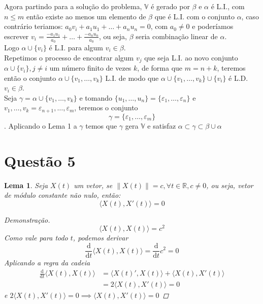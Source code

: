 \documentclass[12pt,letterpaper]{article}
\newtheorem{lemma}{Lema}
\begin{document}
  Agora partindo para a solução do problema, \(\mathbb{V}\) é gerado por \(\beta\) e \(\alpha\) é L.I., com \(n \leq m\) então existe ao menos um elemento de \(\beta\) que é L.I. com o conjunto \(\alpha\), caso contrário teriamos:  \(a_0v_i + a_1u_1 + \dots + a_nu_n = 0\), com \(a_0 \neq 0\) e poderíamos escrever \(v_i = \frac{-a_1u_1}{a_0} + \dots + \frac{-a_nu_n}{a_0}\), ou seja, \(\beta\) seria combinação linear de \(\alpha\).\\
  Logo \(\alpha \cup \{v_i\}\) é L.I. para algum \(v_i \in \beta\).\\
  Repetimos o processo de encontrar algum \(v_j\) que seja L.I. ao novo conjunto  \(\alpha \cup \{v_i\}, j \neq i\) um número finito de vezes \(k\), de forma que \(m = n + k\), teremos então o conjunto \(\alpha \cup \{v_1, \dots, v_k\}\) L.I. de modo que \(\alpha \cup \{v_1, \dots, v_k\} \cup \{v_i\}\) é L.D. \forall \(v_i \in \beta\).\\
  Seja \(\gamma = \alpha \cup \{v_1, \dots, v_k\} \) e tomando \(\{u_1,\dots, u_n\} = \{\varepsilon_1, \dots, \varepsilon_n\}\) e \(v_1, \dots, v_k = \varepsilon_{n+1}, \dots, \varepsilon_m\), teremos o conjunto \[\gamma = \{\varepsilon_1, \dots, \varepsilon_m\}\].
  Aplicando o Lema 1 a \(\gamma\) temos que \(\gamma\) gera \(\mathbb{V}\) e satisfaz \(\alpha \subset \gamma \subset \beta \cup \alpha \)

\newpage
\section*{Questão 5}
\begin{lemma}
Seja \(X(t)\) um vetor, se \(\lVert X(t) \rVert = c, \forall t \in \mathbb{R}, c\neq 0\), ou seja, vetor de módulo constante não nulo, então:
\[\langle X(t), X'(t) \rangle = 0\]
\begin{proof}[Demonstração]
\[\langle X(t), X(t) \rangle = c^2\]
Como vale para todo \(t\), podemos derivar
\[ \frac{\mathrm{d}}{\mathrm{d}t}\langle X(t), X(t) \rangle = \frac{\mathrm{d}}{\mathrm{d}t}c^2 = 0 \]
Aplicando a regra da cadeia
\begin{align*}
  \frac{\mathrm{d}}{\mathrm{d}t} \langle X(t), X(t) \rangle &=  \langle X(t)', X(t) \rangle + \langle X(t), X'(t) \rangle \\
  &= 2 \langle X(t), X'(t) \rangle = 0
\end{align*}
e \(2 \langle X(t), X'(t) \rangle = 0 \implies \langle X(t), X'(t) \rangle = 0\)
\end{proof}
\end{lemma}
\end{document}
